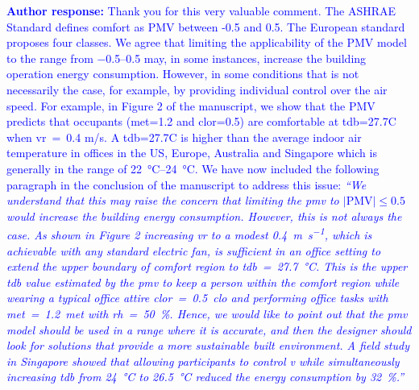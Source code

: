 \documentclass[a4paper, 10pt]{letter}
\newcommand{\response}[1]{\textcolor{blue}{\textbf{Author response:} #1}}
\begin{document}
\begin{letter}
\begin{enumerate}
            \response{
                Thank you for this very valuable comment.
                The ASHRAE Standard defines comfort as PMV between -0.5 and 0.5. 
                The European standard proposes four classes. 
                We agree that limiting the applicability of the PMV model to the range from \numrange{-.5}{.5} may, in some instances, increase the building operation energy consumption.
                However, in some conditions that is not necessarily the case, for example, by providing individual control over the air speed.
                For example, in Figure 2 of the manuscript, we show that the PMV predicts that occupants (met=1.2 and \ac{clor}=0.5) are comfortable at \ac{tdb}=27.7C when \ac{vr}~=~0.4 m/s.
                A \ac{tdb}=27.7C is higher than the average indoor air temperature in offices in the US, Europe, Australia and Singapore which is generally in the range of \qtyrange{22}{24}{\celsius}.
                We have now included the following paragraph in the conclusion of the manuscript to address this issue: \textit{``We understand that this may raise the concern that limiting the \ac{pmv} to $\lvert \textrm{PMV}\lvert \leq 0.5$ would increase the building energy consumption.
                However, this is not always the case.
                As shown in Figure 2 increasing \ac{vr} to a modest \qty{0.4}{\m\per\s}, which is achievable with any standard electric fan, is sufficient in an office setting to extend the upper boundary of comfort region to \ac{tdb}~=~\qty{27.7}{\celsius}.
                This is the upper \ac{tdb} value estimated by the \ac{pmv} to keep a person within the comfort region while wearing a typical office attire \ac{clor}~=~\qty{0.5}{clo} and performing office tasks with \ac{met}~=~\qty{1.2}{met} with \ac{rh}~=~\qty{50}{\percent}.
                Hence, we would like to point out that the \ac{pmv} model should be used in a range where it is accurate, and then the designer should look for solutions that provide a more sustainable built environment.
                A field study in Singapore showed that allowing participants to control \ac{v} while simultaneously increasing \ac{tdb} from \qty{24}{\celsius} to \qty{26.5}{\celsius} reduced the energy consumption by \qty{32}{\percent}.''}
            }


\end{enumerate}
\end{letter}
\end{document}
